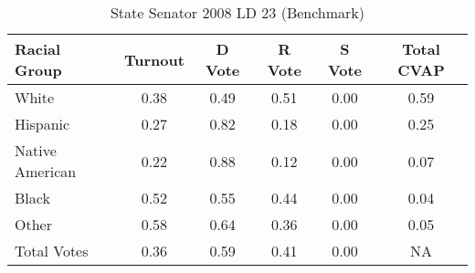 \begin{table}[htb]
\begin{center}
\caption{State Senator 2008 LD 23 (Benchmark)}
\label{stsen08_cvap_ld_23_benchmark}
\begin{tabular}{lccccc}
  \hline
Racial Group & Turnout & D Vote & R Vote & S Vote & Total CVAP \\ 
  \hline
      White & 0.38  & 0.49  & 0.51  & 0.00  & 0.59 \\
    Hispanic & 0.27  & 0.82  & 0.18  & 0.00  & 0.25 \\
    Native American & 0.22  & 0.88  & 0.12  & 0.00  & 0.07 \\
    Black & 0.52  & 0.55  & 0.44  & 0.00  & 0.04 \\
    Other & 0.58  & 0.64  & 0.36  & 0.00  & 0.05 \\
    Total Votes & 0.36  & 0.59  & 0.41  & 0.00  &  NA \\
   \hline
\end{tabular}
\end{center}
\end{table}